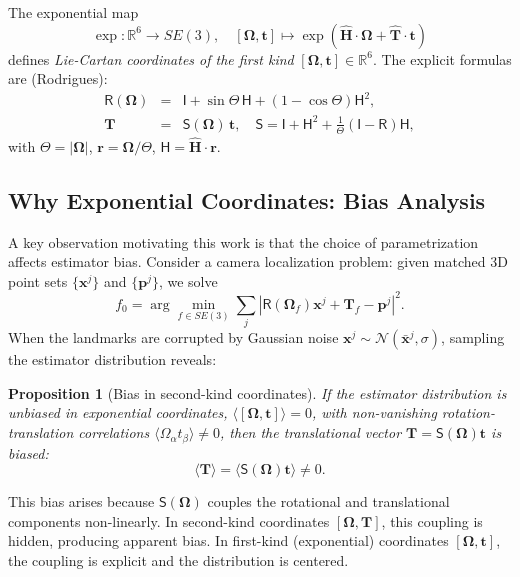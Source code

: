 \documentclass[journal]{IEEEtran}
\newcommand{\real}{\mathbb{R}}
\newcommand{\bfOmega}{\boldsymbol{\Omega}}
\newcommand{\beq}{\begin{equation}}
\newcommand{\eeq}{\end{equation}}
\newcommand{\beqar}{\begin{eqnarray}}
\newcommand{\eeqar}{\end{eqnarray}}
\newtheorem{proposition}{Proposition}
\begin{document}
The exponential map
\beq
    \exp: \real^6 \to SE(3),\quad
    [\bfOmega, \mathbf{t}] \mapsto 
    \exp(\hat{\mathbf{H}} \cdot \bfOmega + \hat{\mathbf{T}} \cdot \mathbf{t})
    \label{eq:expmap}
\eeq
defines \emph{Lie-Cartan coordinates of the first kind} 
$[\bfOmega, \mathbf{t}] \in \real^6$.
The explicit formulas are (Rodrigues):
\beqar
    \mathsf{R}(\bfOmega) &=& \mathsf{I} + \sin\Theta\, \mathsf{H} 
    + (1-\cos\Theta)\mathsf{H}^2, \label{eq:rodrigues} \\
    \mathbf{T} &=& \mathsf{S}(\bfOmega)\, \mathbf{t},\quad
    \mathsf{S} = \mathsf{I} + \mathsf{H}^2 + 
    \frac{1}{\Theta}(\mathsf{I} - \mathsf{R})\mathsf{H}, \nonumber
\eeqar
with $\Theta = |\bfOmega|$, $\mathbf{r} = \bfOmega/\Theta$, 
$\mathsf{H} = \hat{\mathbf{H}} \cdot \mathbf{r}$.

\subsection{Why Exponential Coordinates: Bias Analysis}
\label{subsec:bias}

A key observation motivating this work is that the choice of 
parametrization affects estimator bias. Consider a camera 
localization problem: given matched 3D point sets 
$\{\mathbf{x}^j\}$ and $\{\mathbf{p}^j\}$, we solve
\beq
    f_0 = \arg\min_{f \in SE(3)} \sum_j 
    |\mathsf{R}(\bfOmega_f)\mathbf{x}^j + \mathbf{T}_f - \mathbf{p}^j|^2.
    \label{eq:localization}
\eeq
When the landmarks are corrupted by Gaussian noise 
$\mathbf{x}^j \sim \mathcal{N}(\bar{\mathbf{x}}^j, \sigma)$, 
sampling the estimator distribution reveals:

\begin{proposition}[Bias in second-kind coordinates]
\label{prop:bias}
If the estimator distribution is unbiased in exponential 
coordinates, $\langle [\bfOmega, \mathbf{t}] \rangle = 0$, 
with non-vanishing rotation-translation correlations 
$\langle \Omega_\alpha t_\beta \rangle \neq 0$, then 
the translational vector $\mathbf{T} = \mathsf{S}(\bfOmega)\mathbf{t}$ 
is biased:
\beq
    \langle \mathbf{T} \rangle = 
    \langle \mathsf{S}(\bfOmega)\mathbf{t} \rangle \neq 0.
    \label{eq:biasmechanism}
\eeq
\end{proposition}

This bias arises because $\mathsf{S}(\bfOmega)$ couples 
the rotational and translational components non-linearly. 
In second-kind coordinates $[\bfOmega, \mathbf{T}]$, 
this coupling is hidden, producing apparent bias. 
In first-kind (exponential) coordinates $[\bfOmega, \mathbf{t}]$, 
the coupling is explicit and the distribution is centered.
\end{document}
